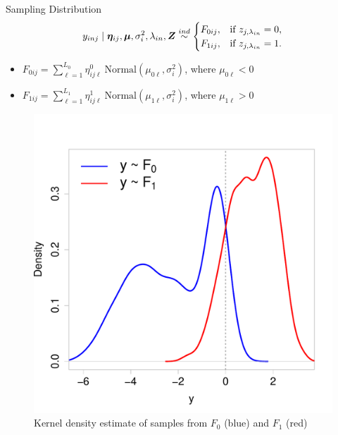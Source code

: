 \documentclass[ignorenonframetext,]{beamer}
\newcommand{\bZ}{\mbox{\boldmath $Z$}}
\newcommand{\ind}{\overset{ind}{\sim}}
\def\bmu{\bm{\mu}}
\def\bet{\bm{\eta}}
\begin{document}
\begin{frame}{Sampling Distribution}
\begin{align*}
y_{inj} \mid \bet_{ij}, \bmu, \sigma^2_i, \lambda_{in}, \bZ \ind
\begin{cases}
  F_{0ij}, &\mbox{if $z_{j,\lambda_{in}}=0$},\\
  F_{1ij}, &\mbox{if $z_{j,\lambda_{in}}=1$}.\\
\end{cases} \label{eq:y-mix}
\end{align*}
\pause
%
\begin{itemize}
  \item $F_{0ij} = \sum_{\ell=1}^{L_0} \eta^0_{ij\ell}~\text{Normal}(\mu_{0\ell}, \sigma^2_i)$, where $\mu_{0\ell} < 0$
  \item $F_{1ij} = \sum_{\ell=1}^{L_1} \eta^1_{ij\ell}~\text{Normal}(\mu_{1\ell}, \sigma^2_i)$, where $\mu_{1\ell} > 0$
\end{itemize}
%
\begin{figure}
  \begin{center}
    \includegraphics[scale=.2]{img/mixture.pdf}
    \caption{Kernel density estimate of samples from $F_0$ (blue) and $F_1$ (red)}
  \end{center}
\end{figure}
\end{frame}
\end{document}
